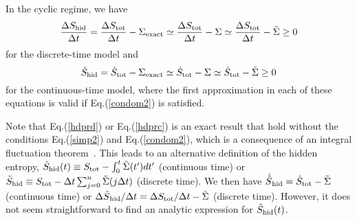 \documentclass[aps,pre,amsmath,amssymb,floatfix,preprint,nofootinbib]{revtex4}
\begin{document}
In the cyclic regime, we have
\begin{equation}
\frac{\Delta S_{\rm hid}}{\Delta t}  = \frac{\Delta S_{\rm tot}}{\Delta t} - \Sigma_{\rm exact} \simeq \frac{\Delta S_{\rm tot}}{\Delta t} - \Sigma \simeq \frac{\Delta S_{\rm tot}}{\Delta t} - \tilde \Sigma \ge 0 
\end{equation}
for the discrete-time model and 
\begin{equation}
\dot S_{\rm hid} = \dot S_{\rm tot} - \Sigma_{\rm exact} \simeq \dot S_{\rm tot} - \Sigma \simeq \dot S_{\rm tot} - \tilde \Sigma \ge 0
\end{equation}
for the continuous-time model, where the first approximation in each of these equations is valid if Eq.(\ref{condom2}) is satisfied.
 
Note that Eq.(\ref{hdprd}) or Eq.(\ref{hdprc}) is an exact result that hold without the conditions Eq.(\ref{simp2}) and Eq.(\ref{condom2}), which is a consequence of an integral fluctuation theorem~\cite{kaw}. This leads to an alternative definition of the hidden entropy, $\tilde S_{\rm hid}(t) \equiv S_{\rm tot} - \int^t_0 \tilde \Sigma(t') dt'$ (continuous time) or $\tilde S_{\rm hid} \equiv S_{\rm tot} - \Delta t  \sum_{j=0}^n \tilde \Sigma(j \Delta t)$ (discrete time). We then have ${\dot {\tilde S}}_{\rm hid} = \dot S_{\rm tot} - \tilde \Sigma$ (continuous time) or ${\Delta {\tilde S}}_{\rm hid}/\Delta t = \Delta S_{\rm tot}/\Delta t - \tilde \Sigma$ (discrete time). However, it does not seem straightforward to find an analytic expression for  $\tilde S_{\rm hid}(t)$.
\end{document}
